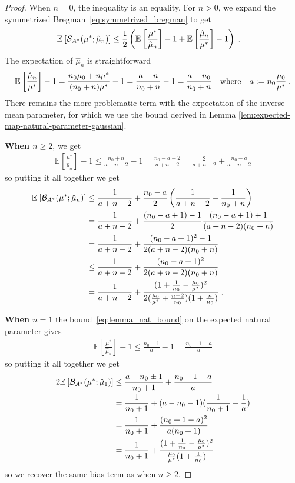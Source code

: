 \documentclass[twoside]{article}
\newcommand*{\expect}[2][]{\ensuremath{\mathbb{E}_{#1} \left[ #2 \right] }} %
\newcommand{\logpart}{A}
\newcommand{\conj}{{\logpart^*}}
\newcommand{\bregmanconj}{\cB_{\logpart^*}}
\newcommand{\m}{\mu}
\newcommand{\MAPm}{\hat \m_n}
\begin{document}
\begin{proof}
When $n=0$, the inequality is an equality. 
For $n>0$, we expand the symmetrized Bregman~\eqref{eq:symmetrized_bregman} to get
\begin{align}
	\expect{\cS_\conj(\mu^*; \MAPm)} 
	&\leq \half \paren{\expect{\frac{\mu^*}{\MAPm}} -1  + \expect{\frac{\MAPm}{\mu^*}} - 1} \; .
\end{align}
The expectation of $\MAPm$ is straightforward
\begin{align}
	 \expect{\frac{\MAPm}{\mu^*}} - 1 
	 = \frac{n_0 \mu_0 + n \mu^*}{(n_0+n)\mu^*} - 1 
	 = \frac{a+n}{n_0+n} - 1 = \frac{a - n_0}{n_0+n}
	 \quadtext{where}
	 a:=n_0\frac{\mu_0}{\mu^*} \; .
\end{align}
There remains the more problematic term with the expectation of the inverse mean parameter, 
for which we use the bound derived in Lemma \ref{lem:expected-map-natural-parameter-gaussian}.

\textbf{When $n\geq 2$}, we get 
\begin{align}
	\expect{\frac{\mu^*}{\MAPm}} - 1 
	\leq \frac{n_0 + n}{a +n - 2} -1
	= \frac{n_0 - a + 2}{a +n - 2}
	 = \frac{2}{a +n - 2} + \frac{n_0 - a}{a +n - 2}
\end{align}
so putting it all together we get 
\begin{align}
	\expect{\bregmanconj(\mu^*; \MAPm)} 
	&\leq \frac{1}{a+n-2} + \frac{n_0-a}{2}  \left( \inv{a+n-2} - \inv{n_0+n} \right)\\
	&= \frac{1}{a+n-2} + \frac{(n_0-a + 1) - 1}{2}  \frac{(n_0 - a + 1) + 1}{(a+n-2)(n_0+n)} \\
	&= \frac{1}{a+n-2} + \frac{(n_0 - a +1)^2 - 1}{2(a+n-2)(n_0+n)} \\
	&\leq \frac{1}{a+n-2} + \frac{(n_0 - a +1)^2}{2(a+n-2)(n_0 + n)} \\
	&= \frac{1}{a+n-2} + \frac{(1 + \inv{n_0} - \frac{\mu_0}{\mu^*})^2}{2 (\frac{\mu_0}{\mu^*}+\frac{n-2}{n_0})(1 + \frac{n}{n_0} )} \; .
\end{align}

\textbf{When $n=1$} the bound~\eqref{eq:lemma_nat_bound}  on the expected natural parameter gives
\begin{align}
	\expect{\frac{\mu^*}{\MAPm}} - 1 
	\leq \frac{n_0 + 1}{a} -1
	= \frac{n_0 +1 - a}{a}
\end{align}
so putting it all together we get
\begin{align}
	2\expect{\bregmanconj(\mu^*; \hat \mu_1)} 
	&\leq \frac{a - n_0 \pm 1}{n_0 + 1}  + \frac{n_0 +1 - a }{a} \\
	& = \inv{n_0+1}  + ( a - n_0 - 1)(\inv{n_0+1} - \inv{a}) \\
	& = \inv{n_0+1}  + \frac{(n_0 + 1 -a)^2}{a(n_0+1)}\\
	&= \inv{n_0+1}  + \frac{(1 + \inv{n_0} - \frac{\mu_0}{\mu^*})^2}{\frac{\mu_0}{\mu^*}(1 + \inv{n_0} )} 
\end{align}
so we  recover the same bias term as when $n\geq2$.
\end{proof}
\end{document}
